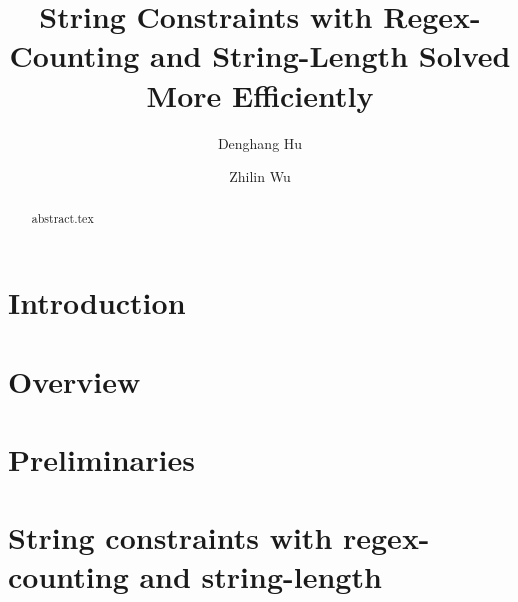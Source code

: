 \documentclass[runningheads]{llncs}
\newcommand{\zhilin}[1]{\color{orange}\textbf{ZL:} #1 \textbf{:LZ}\color{black}}
\newcommand{\denghang}[1]{{\color{teal}\textbf{DH:} #1 \textbf{:HD}\color{black}}}
\begin{document}
\title{String Constraints with Regex-Counting and String-Length Solved More Efficiently}

\author{Denghang Hu \and
  Zhilin Wu}


\maketitle

\begin{abstract}
{abstract.tex}
\end{abstract}


\section{Introduction} \label{sec:intro}


\section{Overview} \label{sec:overview}


\section{Preliminaries} \label{sec:pre}


\section{String constraints with regex-counting and string-length}\label{sec:recl}
\end{document}
